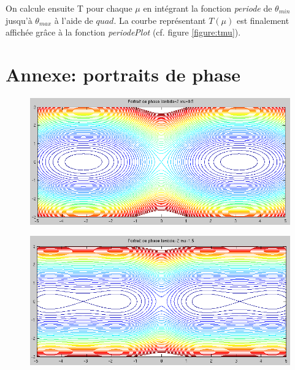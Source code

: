 \documentclass[11pt]{article}
\begin{document}
On calcule ensuite T pour chaque $\mu$ en intégrant la fonction \emph{periode} de $\theta_{min}$ jusqu'à $\theta_{max}$ à l'aide de $quad$. La courbe représentant $T(\mu)$ est finalement affichée grâce à la fonction \emph{periodePlot} (cf. figure \ref{figure:tmu}).
\newpage

\appendix
\section{Annexe: portraits de phase}
\begin{figure}[h!]
	\centering
	\includegraphics[scale=0.64]{Figures/rapport_pp05.png}
\end{figure}

\begin{figure}[h!]
	\centering
	\includegraphics[scale=0.65]{Figures/rapport_pp15.png}
\end{figure}
\end{document}
